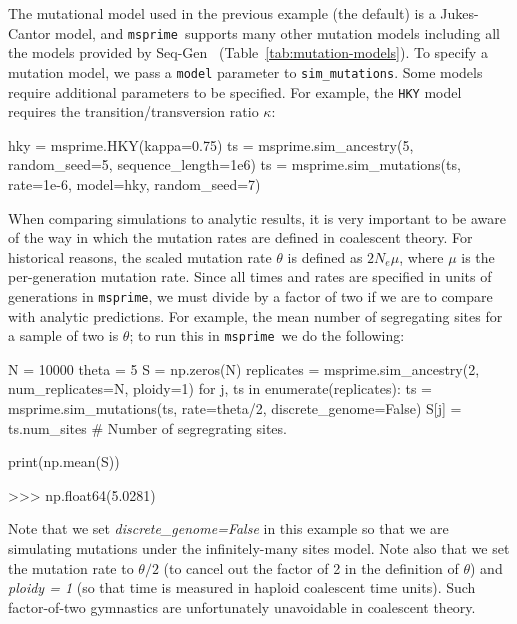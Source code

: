 \documentclass[graybox]{svmult}
\newcommand{\msprime}[0]{\texttt{msprime}}
\begin{document}
The mutational model used in the previous example (the
default) is a Jukes-Cantor model, and
\msprime\ supports many other mutation models
including all the models provided by
Seq-Gen~\citep{rambaut1997seq}
(Table~\ref{tab:mutation-models}).
To specify a mutation model, we pass a \texttt{model} parameter to \texttt{sim\_mutations}.
Some models
require additional parameters to be specified.
For example, the \texttt{HKY} model requires the transition/transversion
ratio $\kappa$:

\begin{pythoncode}
hky = msprime.HKY(kappa=0.75)
ts = msprime.sim_ancestry(5, random_seed=5, sequence_length=1e6)
ts = msprime.sim_mutations(ts, rate=1e-6, model=hky, random_seed=7)
\end{pythoncode}

When comparing simulations to analytic results, it is very important to be aware of the way in which the
mutation rates are defined in coalescent theory. For historical reasons,
the scaled mutation rate \(\theta\) is defined as \(2N_e \mu\), where
\(\mu\) is the per-generation mutation rate. Since all times and rates
are specified in units of generations in \msprime, we must divide by a
factor of two if we are to compare with analytic predictions. For
example, the mean number of segregating sites for a sample of two is
\(\theta\); to run this in \msprime\ we do the following:

\begin{pythoncode}
N = 10000
theta = 5
S = np.zeros(N)
replicates = msprime.sim_ancestry(2, num_replicates=N, ploidy=1)
for j, ts in enumerate(replicates):
    ts = msprime.sim_mutations(ts, rate=theta/2,
        discrete_genome=False)
    S[j] = ts.num_sites  # Number of segregrating sites.

print(np.mean(S))

>>> np.float64(5.0281)

\end{pythoncode}

Note that we set \emph{discrete\_genome=False} in this example so that
we are simulating mutations under the infinitely-many sites model.
Note also that we set the mutation rate to \(\theta / 2\) (to cancel out
the factor of 2 in the definition of \(\theta\)) and \emph{ploidy = 1} (so
that time is measured in haploid coalescent time units).
Such factor-of-two gymnastics are unfortunately unavoidable in coalescent
theory.
\end{document}
